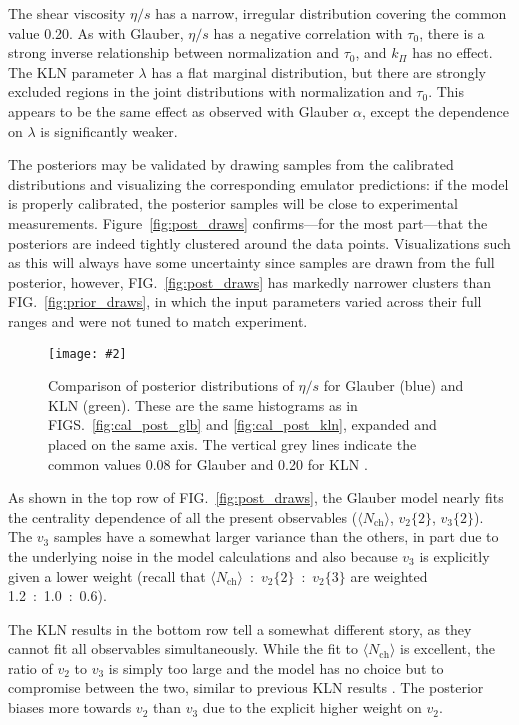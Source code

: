 \documentclass[aps,prc,reprint,superscriptaddress,amsmath]{revtex4-1}
\newcommand{\colfig}[3][t]{
  \begin{figure}[#1]
    \texttt{[image: \#2]}
    \caption{\label{fig:#2}#3}
  \end{figure}
}
\newcommand{\avg}[1]{\langle #1 \rangle}
\newcommand{\nch}{N_\text{ch}}
\newcommand{\vnk}[2]{v_#1\{#2\}}
\begin{document}
The shear viscosity $\eta/s$ has a narrow, irregular distribution covering the common value 0.20.
As with Glauber, $\eta/s$ has a negative correlation with $\tau_0$, there is a strong inverse relationship between normalization and $\tau_0$, and $k_\Pi$ has no effect.
The KLN parameter $\lambda$ has a flat marginal distribution, but there are strongly excluded regions in the joint distributions with normalization and $\tau_0$.
This appears to be the same effect as observed with Glauber $\alpha$, except the dependence on $\lambda$ is significantly weaker.

The posteriors may be validated by drawing samples from the calibrated distributions and visualizing the corresponding emulator predictions:
if the model is properly calibrated, the posterior samples will be close to experimental measurements.
Figure~\ref{fig:post_draws} confirms---for the most part---that the posteriors are indeed tightly clustered around the data points.
Visualizations such as this will always have some uncertainty since samples are drawn from the full posterior, however, FIG.~\ref{fig:post_draws} has markedly narrower clusters than FIG.~\ref{fig:prior_draws}, in which the input parameters varied across their full ranges and were not tuned to match experiment.

\colfig[b]{post_compare}{
  Comparison of posterior distributions of $\eta/s$ for Glauber (blue) and KLN (green).
  These are the same histograms as in FIGS.~\ref{fig:cal_post_glb} and \ref{fig:cal_post_kln}, expanded and placed on the same axis.
  The vertical grey lines indicate the common values 0.08 for Glauber and 0.20 for KLN \cite{Shen:2011zc,Heinz:2011kt}.
}

As shown in the top row of FIG.~\ref{fig:post_draws}, the Glauber model nearly fits the centrality dependence of all the present observables ($\avg\nch$, $\vnk 2 2$, $\vnk 3 2$).
The $v_3$ samples have a somewhat larger variance than the others, in part due to the underlying noise in the model calculations and also because $v_3$ is explicitly given a lower weight (recall that $\avg\nch$~:~$\vnk 2 2$~:~$\vnk 2 3$ are weighted 1.2~:~1.0~:~0.6).

The KLN results in the bottom row tell a somewhat different story, as they cannot fit all observables simultaneously.
While the fit to $\avg\nch$ is excellent, the ratio of $v_2$ to $v_3$ is simply too large and the model has no choice but to compromise between the two, similar to previous KLN results \cite{Qiu:2011hf}.
The posterior biases more towards $v_2$ than $v_3$ due to the explicit higher weight on $v_2$.
\end{document}

